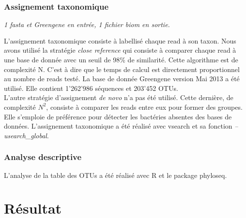 \documentclass[12pt,a4paper]{article}
\begin{document}
\subsubsection{Assignement taxonomique} \begin{center}\emph{1 fasta et Greengene en entrée,  1 fichier biom  en sortie. }\end{center} 

L’assignement taxonomique consiste à labellisé chaque read à son taxon. Nous avons utilisé la stratégie \textit{close reference} qui consiste à comparer chaque read à une base de donnée avec un seuil de 98\% de similarité. Cette algorithme est de complexité N. C'est à dire que le temps de calcul est directement proportionnel au nombre de reads testé. La base de donnée Greengene version Mai 2013  a été utilisé. Elle contient 1'262'986 séquences et 203'452 OTUs. \\
L'autre stratégie d'assignement \textit{de novo} n'a pas été utilisé. Cette dernière, de complexité $N^{2}$, consiste à comparer les reads entre eux pour former des groupes. Elle s'emploie de préférence pour détecter les bactéries absentes des bases de données.
L'assignement taxonomique a été réalisé avec vsearch et sa fonction \textit{--usearch\_global}. 

\subsubsection{Analyse descriptive}
L'analyse de la table des OTUs a été réalisé avec R et le package phyloseq. 


\section{Résultat}
\end{document}
